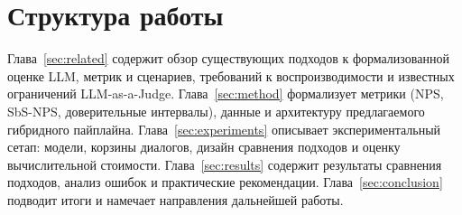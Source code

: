 \section{Структура работы}
\label{sec:intro:structure}

Глава~\ref{sec:related} содержит обзор существующих подходов к
формализованной оценке LLM, метрик и сценариев, требований к
воспроизводимости и известных ограничений LLM-as-a-Judge.
Глава~\ref{sec:method} формализует метрики (NPS, SbS-NPS, доверительные
интервалы), данные и архитектуру предлагаемого гибридного пайплайна.
Глава~\ref{sec:experiments} описывает экспериментальный сетап: модели,
корзины диалогов, дизайн сравнения подходов и оценку вычислительной
стоимости.
Глава~\ref{sec:results} содержит результаты сравнения подходов, анализ
ошибок и практические рекомендации.
Глава~\ref{sec:conclusion} подводит итоги и намечает направления
дальнейшей работы.
